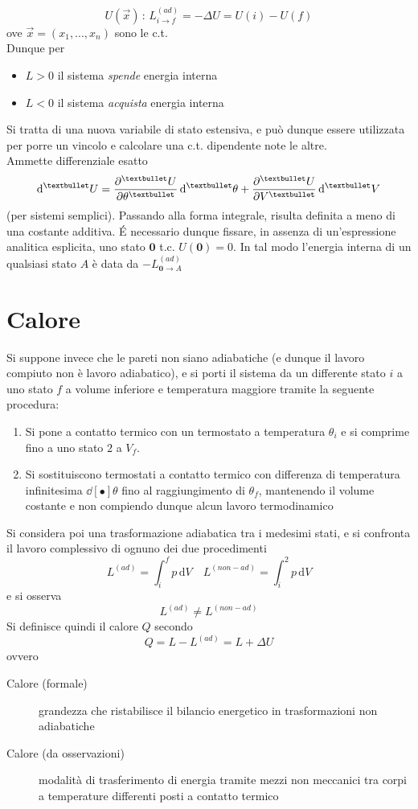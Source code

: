 \documentclass[10pt, oneside]{book}
\newcommand{\ds}{\displaystyle}
\newcommand{\integral}[4]{\int_{#1}^{#2} #3 \, \mathrm{d}#4}
\begin{document}
\[U(\vec{x}) \, : \, L^{(ad)}_{i \rightarrow f} = - \Delta U = U(i) - U(f)\]
ove $\vec{x} = (x_1, ..., x_n)$ sono le c.t.\\
Dunque per
\begin{itemize}
\item $L > 0$ il sistema \textit{spende} energia interna
\item $L < 0$ il sistema \textit{acquista} energia interna
\end{itemize}
Si tratta di una nuova variabile di stato estensiva, e può dunque essere utilizzata per porre un vincolo e calcolare una c.t. dipendente note le altre.\\
Ammette differenziale esatto
\[\dd[•]{U} = \pdv[•]{U}{\theta} \dd[•]{\theta} + \pdv[•]{U}{V} \dd[•]{V}\]
(per sistemi semplici). Passando alla forma integrale, risulta definita a meno di una costante additiva. \'E necessario dunque fissare, in assenza di un'espressione analitica esplicita,  uno stato $\mathbf{0}$ t.c. $U(\mathbf{0}) = 0$. In tal modo l'energia interna di un qualsiasi stato $A$ è data da $\ds -L^{(ad)}_{\mathbf{0} \rightarrow A}$

\section{Calore}
Si suppone invece che le pareti non siano adiabatiche (e dunque il lavoro compiuto non è lavoro adiabatico), e si porti il sistema da un differente stato $i$ a uno stato $f$ a volume inferiore e temperatura maggiore tramite la seguente procedura:
\begin{enumerate}
\item Si pone a contatto termico con un termostato a temperatura $\theta_i$ e si comprime fino a uno stato $2$ a $V_f$.
\item Si sostituiscono termostati a contatto termico con differenza di temperatura infinitesima $\dd[•]{\theta}$ fino al raggiungimento di $\theta_f$, mantenendo il volume costante e non compiendo dunque alcun lavoro termodinamico
\end{enumerate}
Si considera poi una trasformazione adiabatica tra i medesimi stati, e si confronta il lavoro complessivo di ognuno dei due procedimenti
\[L^{(ad)} = \integral{i}{f}{p}{V} \quad L^{(non-ad)} = \integral{i}{2}{p}{V}\]
e si osserva
\[L^{(ad)} \neq L^{(non-ad)}\]
Si definisce quindi il calore $Q$ secondo
\[Q = L - L^{(ad)} = L + \Delta U\]
ovvero
\begin{description}
\item[Calore (formale)] grandezza che ristabilisce il bilancio energetico in trasformazioni non adiabatiche
\item[Calore (da osservazioni)] modalità di trasferimento di energia tramite mezzi non meccanici tra corpi a temperature differenti posti a contatto termico
\end{description}
\end{document}
